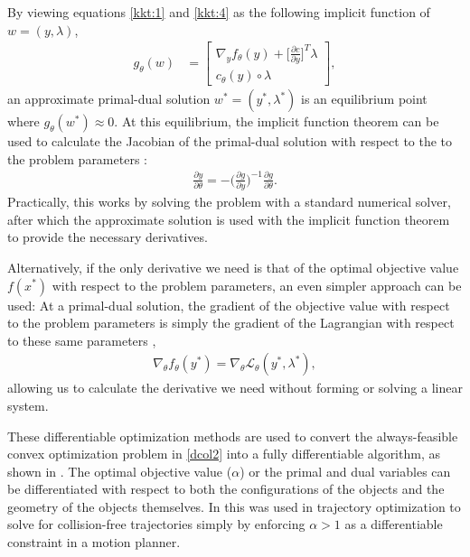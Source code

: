 By viewing equations \eqref{kkt:1} and \eqref{kkt:4} as the following implicit function of $w = (y, \lambda)$,
%
\begin{align}
    g_\theta(w) &= \begin{bmatrix}
        \nabla_y f_\theta(y) + \big[ \frac{\partial c}{\partial y} \big]^T\lambda \\ 
         c_\theta(y) \circ \lambda
    \end{bmatrix},
\end{align}
%
an approximate primal-dual solution $w^* = (y^*, \lambda^*)$ is an equilibrium point where $g_\theta(w^*) \approx 0$. At this equilibrium, the implicit function theorem can be used to calculate the Jacobian of the primal-dual solution with respect to the to the problem parameters \cite{howell2022}:
%
\begin{align}
    \frac{\partial y}{\partial \theta} = - \bigg( \frac{\partial g}{\partial y} \bigg)^{-1}\frac{\partial g}{\partial \theta}. \label{eq:ift2}
\end{align}
%
Practically, this works by solving the problem with a standard numerical solver, after which the approximate solution is used with the implicit function theorem to provide the necessary derivatives.

Alternatively, if the only derivative we need is that of the optimal objective value $f(x^*)$ with respect to the problem parameters, an even simpler approach can be used: At a primal-dual solution, the gradient of the objective value with respect to the problem parameters is simply the gradient of the Lagrangian with respect to these same parameters \cite{castillo2006},
%
\begin{align}
    \nabla_\theta f_\theta(y^*)= \nabla_\theta \mathcal{L}_\theta(y^*, \lambda^*), \label{eq:lag_grad}
\end{align}
%
allowing us to calculate the derivative we need without forming or solving a linear system.

These differentiable optimization methods are used to convert the always-feasible convex optimization problem in \eqref{dcol2} into a fully differentiable algorithm, as shown in \cite{tracy2023b}. The optimal objective value ($\alpha$) or the primal and dual variables can be differentiated with respect to both the configurations of the objects and the geometry of the objects themselves. In \cite{tracy2023b} this was used in trajectory optimization to solve for collision-free trajectories simply by enforcing $\alpha > 1$ as a differentiable constraint in a motion planner.
%
%
%
%
